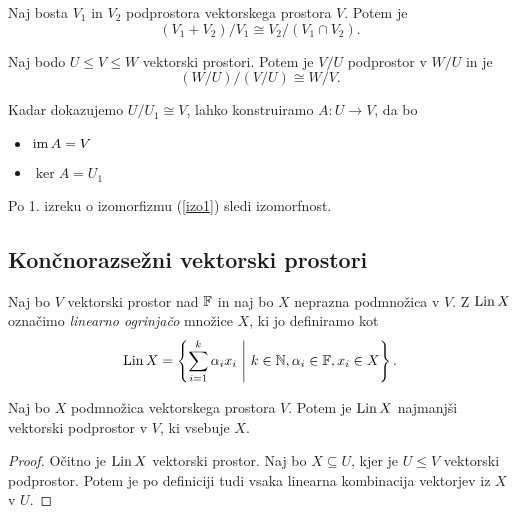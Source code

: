 \documentclass[12pt, a4paper]{article}
\begin{document}
\obvs

\begin{izrek}\label{izo2}
Naj bosta $V_1$ in $V_2$ podprostora vektorskega prostora $V$. Potem je
\[
(V_1+V_2)/V_1\cong V_2/(V_1\cap V_2).
\]
\end{izrek}

\obvs

\begin{izrek}\label{izo3}
Naj bodo $U\leq V\leq W$ vektorski prostori. Potem je $V/U$ podprostor v $W/U$ in je
\[
(W/U)/(V/U)\cong W/V.
\]
\end{izrek}

\obvs

\begin{opomba}
Kadar dokazujemo $U/U_1\cong V$, lahko konstruiramo $A\colon U\to V$, da bo

\begin{itemize}
\item $\operatorname{im} A=V$
\item $\ker A=U_1$
\end{itemize}

Po 1. izreku o izomorfizmu (\ref{izo1}) sledi izomorfnost.
\end{opomba}

\newpage

\subsection{Končnorazsežni vektorski prostori}

\begin{definicija}
Naj bo $V$ vektorski prostor nad $\mathbb{F}$ in naj bo $X$ neprazna podmnožica v $V$. Z $\operatorname{Lin} X$ označimo \emph{linearno ogrinjačo} množice $X$, ki jo definiramo kot
\[
\operatorname{Lin} X=\left\{\sum_{i=1}^k \alpha_ix_i~\middle\vert~k\in\mathbb{N},\alpha_i\in\mathbb{F},x_i\in X\right\}.
\]
\end{definicija}

\begin{trditev}
Naj bo $X$ podmnožica vektorskega prostora $V$. Potem je $\operatorname{Lin} X$ najmanjši vektorski podprostor v $V$, ki vsebuje $X$.
\end{trditev}

\begin{proof}
Očitno je $\operatorname{Lin} X$ vektorski prostor. Naj bo $X\subseteq U$, kjer je $U\leq V$ vektorski podprostor. Potem je po definiciji tudi vsaka linearna kombinacija vektorjev iz $X$ v $U$.
\end{proof}
\end{document}
